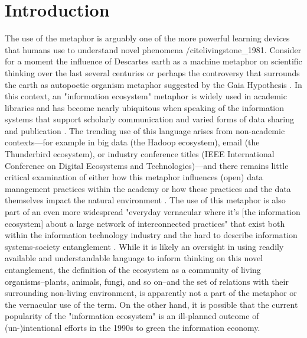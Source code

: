 \section{Introduction}

The use of the metaphor is arguably one of the more powerful learning devices that humans use to understand novel phenomena /cite{livingstone_1981}. Consider for a moment the influence of Descartes earth as a machine metaphor on scientific thinking over the last several centuries \cite{abram_1991} or perhaps the controversy that surrounds the earth as autopoetic organism metaphor suggested by the Gaia Hypothesis \cite{lovelock_1974}. In this context, an "information ecosystem" metaphor is widely used in academic libraries and has become nearly ubiquitous when speaking of the information systems that support scholarly communication and varied forms of data sharing and publication \cite[for example see][]{walter_2008}. The trending use of this language arises from non-academic contexts—for example in big data (the Hadoop ecosystem), email (the Thunderbird ecosystem), or industry conference titles (IEEE International Conference on Digital Ecosystems and Technologies)—and there remains little critical examination of either how this metaphor influences (open) data management practices within the academy or how these practices and the data themselves impact the natural environment \cite[although see][]{stepp_1999}. The use of this metaphor is also part of an even more widespread "everyday vernacular where it’s [the information ecosystem] about a large network of interconnected practices" that exist both within the information technology industry and the hard to describe information systems-society entanglement \cite{boyd_2016}. While it is likely an oversight in using readily available and understandable language to inform thinking on this novel entanglement, the definition of the ecosystem as a community of living organisms--plants, animals, fungi, and so on--and the set of relations with their surrounding non-living environment, is apparently not a part of the metaphor or the vernacular use of the term. On the other hand, it is possible that the current popularity of the "information ecosystem" is an ill-planned outcome of (un-)intentional efforts in the 1990s to green the information economy.

